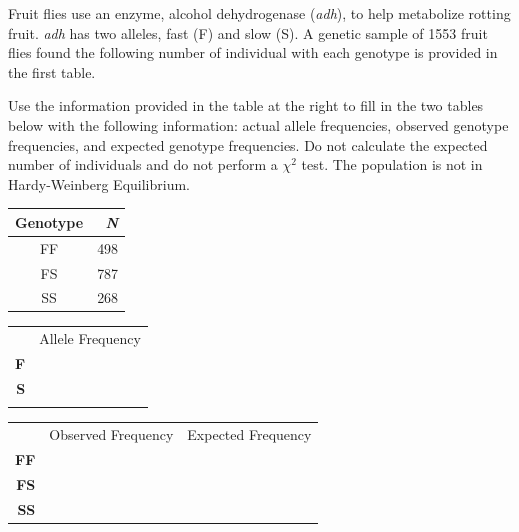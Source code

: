 
\question[15]
Fruit flies use an enzyme, alcohol dehydrogenase (\emph{adh}), to help metabolize rotting fruit. \emph{adh} has two alleles, fast (F) and slow (S).  A genetic sample of 1553 fruit flies found the following number of individual with each genotype is provided in the first table.

\vspace{\baselineskip}

\begin{minipage}{0.6\linewidth}
Use the information provided in the table at the right to fill in the two tables below with the following information: actual allele frequencies, observed genotype frequencies, and expected genotype frequencies.  Do not calculate the expected number of individuals and do not perform a $\chi^2$ test. The population is not in Hardy-Weinberg Equilibrium.
\end{minipage}\hfill
\begin{minipage}{0.3\linewidth}
	\begin{tabular}{cr}
	\toprule
	Genotype	&	\emph{N}\\
	\midrule
	FF	&	498\\
	FS	&	787\\
	SS	&	268\\
	\bottomrule
	\end{tabular}\vfill
\end{minipage}

\vspace{\baselineskip}

\begin{minipage}{0.3\linewidth}
	\begin{tabular}{rc}
	&	Allele Frequency\\[3ex]
	\Large\textbf{F} & \makebox[3cm]{\hrulefill}\\[3ex]
	\Large\textbf{S} & \makebox[3cm]{\hrulefill}\\[3ex]
	\Large\null	 & \null\\
	\end{tabular}
\end{minipage}\hfill
\begin{minipage}{0.6\linewidth}
	\begin{tabular}{rcc}
		&	Observed Frequency		&	Expected Frequency\\[3ex]
		\large\textbf{FF} & \makebox[3cm]{\hrulefill} & \makebox[3cm]{\hrulefill} \\[3ex]
		\large\textbf{FS} & \makebox[3cm]{\hrulefill} & \makebox[3cm]{\hrulefill} \\[3ex]
		\large\textbf{SS} & \makebox[3cm]{\hrulefill} & \makebox[3cm]{\hrulefill} \\
	\end{tabular}
\end{minipage}

